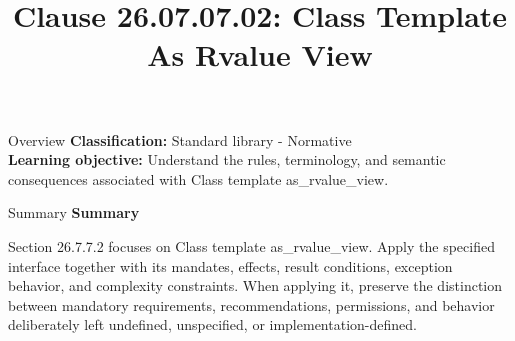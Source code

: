 \documentclass[10pt,letterpaper]{article}
\title{Clause 26.07.07.02: Class Template As Rvalue View}
\author{}
\date{}
\begin{document}
\maketitle
\begin{CornellOverviewBox}{Overview}
\textbf{Classification:} Standard library - Normative\\[2pt]
\textbf{Learning objective:} Understand the rules, terminology, and semantic consequences associated with Class template as\_rvalue\_view.
\end{CornellOverviewBox}\begin{CornellSummaryBox}{Summary}
{\sffamily\bfseries\color{Accent} Summary}\par\vspace{3pt}Section 26.7.7.2 focuses on Class template as\_rvalue\_view. Apply the specified interface together with its mandates, effects, result conditions, exception behavior, and complexity constraints. When applying it, preserve the distinction between mandatory requirements, recommendations, permissions, and behavior deliberately left undefined, unspecified, or implementation-defined.
\end{CornellSummaryBox}
\end{document}
